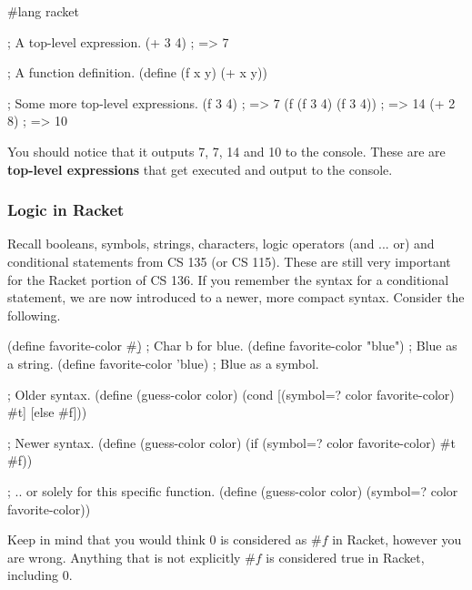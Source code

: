 
\begin{code}[Lisp]
#lang racket

; A top-level expression.
(+ 3 4) ; => 7

; A function definition.
(define (f x y)
	(+ x y))

; Some more top-level expressions.
(f 3 4) ; => 7
(f (f 3 4) (f 3 4)) ; => 14
(+ 2 8) ; => 10
\end{code}

You should notice that it outputs 7, 7, 14 and 10 to the console. These are are \textbf{top-level expressions} that get executed and output to the console.

\subsubsection*{Logic in Racket}

Recall booleans, symbols, strings, characters, logic operators (and ... or) and conditional statements from CS 135 (or CS 115). These are still very important for the Racket portion of CS 136. If you remember the syntax for a conditional statement, we are now introduced to a newer, more compact syntax. Consider the following.\\


\begin{code}[Lisp]
(define favorite-color #\b) ; Char b for blue.
(define favorite-color "blue") ; Blue as a string.
(define favorite-color 'blue) ; Blue as a symbol.

; Older syntax.
(define (guess-color color)
	(cond
		[(symbol=? color favorite-color) #t]
		[else #f]))

; Newer syntax.
(define (guess-color color)
	(if (symbol=? color favorite-color) #t #f))

; .. or solely for this specific function.
(define (guess-color color)
	(symbol=? color favorite-color))
\end{code}

Keep in mind that you would think 0 is considered as $\#f$ in Racket, however you are wrong. Anything that is not explicitly $\#f$ is considered true in Racket, including 0.\\


